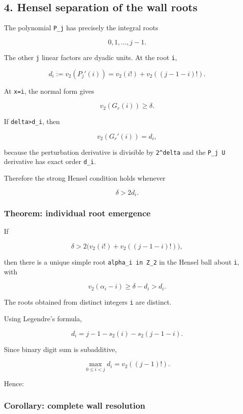 \documentclass[11pt,letterpaper]{article}
\begin{document}
\subsection{4. Hensel separation of the wall roots}\label{hensel-separation-of-the-wall-roots}

The polynomial \texttt{P\_j} has precisely the integral roots

\[
0,1,\ldots,j-1.
\]

The other \texttt{j} linear factors are dyadic units. At the root \texttt{i},

\[
\boxed{
d_i
:=v_2(P_j'(i))
=v_2(i!)+v_2((j-1-i)!).
}
\]

At \texttt{x=i}, the normal form gives

\[
v_2(G_r(i))\ge\delta.
\]

If \texttt{delta\textgreater{}d\_i}, then

\[
v_2(G_r'(i))=d_i,
\]

because the perturbation derivative is divisible by \texttt{2\^{}delta} and the \texttt{P\_j\ U} derivative has exact order \texttt{d\_i}.

Therefore the strong Hensel condition holds whenever

\[
\boxed{\delta>2d_i.}
\]

\subsubsection{Theorem: individual root emergence}\label{theorem-individual-root-emergence}

If

\[
\delta>2\bigl(v_2(i!)+v_2((j-1-i)!)\bigr),
\]

then there is a unique simple root \texttt{alpha\_i\ in\ Z\_2} in the Hensel ball about \texttt{i}, with

\[
\boxed{
v_2(\alpha_i-i)\ge\delta-d_i>d_i.}
\]

The roots obtained from distinct integers \texttt{i} are distinct.

Using Legendre's formula,

\[
d_i=j-1-s_2(i)-s_2(j-1-i).
\]

Since binary digit sum is subadditive,

\[
\boxed{
\max_{0\le i<j}d_i
=v_2((j-1)!).
}
\]

Hence:

\subsubsection{Corollary: complete wall resolution}\label{corollary-complete-wall-resolution}
\end{document}
